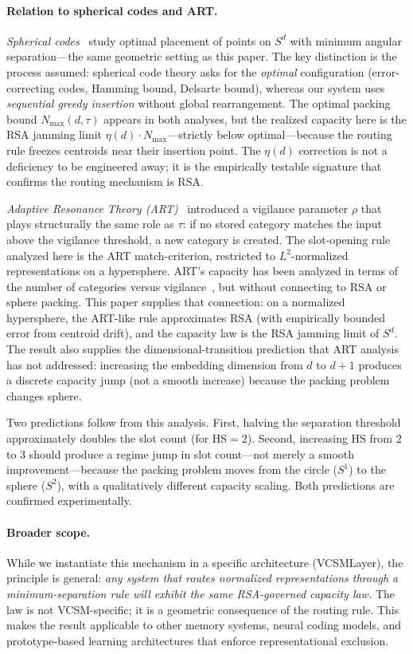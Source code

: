 \documentclass[11pt]{article}
\begin{document}
\paragraph{Relation to spherical codes and ART.}
\emph{Spherical codes}~\cite{conway_sloane} study optimal placement of points on $S^d$ with minimum angular separation---the same geometric setting as this paper.
The key distinction is the process assumed: spherical code theory asks for the \emph{optimal} configuration (error-correcting codes, Hamming bound, Delsarte bound), whereas our system uses \emph{sequential greedy insertion} without global rearrangement.
The optimal packing bound $N_{\max}(d, \tau)$ appears in both analyses, but the realized capacity here is the RSA jamming limit $\eta(d)\cdot N_{\max}$---strictly below optimal---because the routing rule freezes centroids near their insertion point.
The $\eta(d)$ correction is not a deficiency to be engineered away; it is the empirically testable signature that confirms the routing mechanism is RSA.

\emph{Adaptive Resonance Theory (ART)}~\cite{carpenter1987} introduced a vigilance parameter $\rho$ that plays structurally the same role as $\tau$: if no stored category matches the input above the vigilance threshold, a new category is created.
The slot-opening rule analyzed here is the ART match-criterion, restricted to $L^2$-normalized representations on a hypersphere.
ART's capacity has been analyzed in terms of the number of categories versus vigilance~\cite{carpenter1987}, but without connecting to RSA or sphere packing.
This paper supplies that connection: on a normalized hypersphere, the ART-like rule approximates RSA (with empirically bounded error from centroid drift), and the capacity law is the RSA jamming limit of $S^d$.
The result also supplies the dimensional-transition prediction that ART analysis has not addressed: increasing the embedding dimension from $d$ to $d+1$ produces a discrete capacity jump (not a smooth increase) because the packing problem changes sphere.

Two predictions follow from this analysis.
First, halving the separation threshold approximately doubles the slot count
(for $\mathrm{HS}=2$).
Second, increasing $\mathrm{HS}$ from 2 to 3 should produce a regime jump
in slot count---not merely a smooth improvement---because the packing problem
moves from the circle ($S^1$) to the sphere ($S^2$), with a qualitatively
different capacity scaling.
Both predictions are confirmed experimentally.

\paragraph{Broader scope.}
While we instantiate this mechanism in a specific architecture (VCSMLayer),
the principle is general: \emph{any system that routes normalized representations
through a minimum-separation rule will exhibit the same RSA-governed capacity law.}
The law is not VCSM-specific; it is a geometric consequence of the routing rule.
This makes the result applicable to other memory systems, neural coding models,
and prototype-based learning architectures that enforce representational exclusion.
\end{document}
